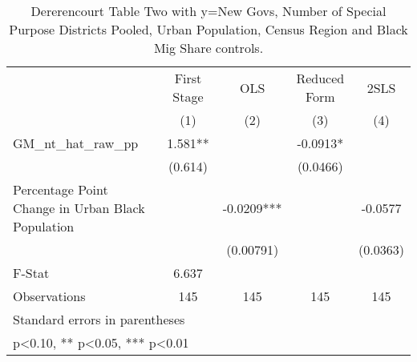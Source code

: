 \begin{table}[htbp]\centering
\def\sym#1{\ifmmode^{#1}\else\(^{#1}\)\fi}
\caption{Dererencourt Table Two with y=New Govs, Number of Special Purpose Districts Pooled, Urban Population, Census Region and Black Mig Share controls.}
\begin{tabular}{l*{4}{c}}
\toprule
                    & First Stage   &         OLS   &Reduced Form   &        2SLS   \\
                    &\multicolumn{1}{c}{(1)}   &\multicolumn{1}{c}{(2)}   &\multicolumn{1}{c}{(3)}   &\multicolumn{1}{c}{(4)}   \\
\midrule
GM\_nt\_hat\_raw\_pp    &       1.581** &               &     -0.0913*  &               \\
                    &     (0.614)   &               &    (0.0466)   &               \\
\addlinespace
Percentage Point Change in Urban Black Population&               &     -0.0209***&               &     -0.0577   \\
                    &               &   (0.00791)   &               &    (0.0363)   \\
\midrule
F-Stat              &       6.637   &               &               &               \\
Observations        &         145   &         145   &         145   &         145   \\
\bottomrule
\multicolumn{5}{l}{\footnotesize Standard errors in parentheses}\\
\multicolumn{5}{l}{\footnotesize * p<0.10, ** p<0.05, *** p<0.01}\\
\end{tabular}
\end{table}
